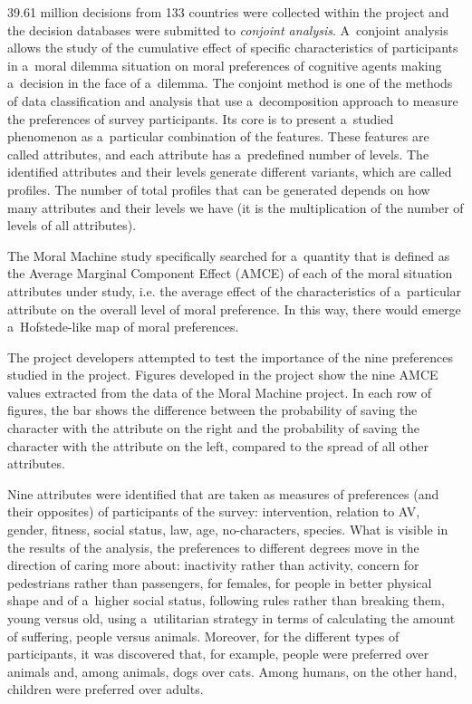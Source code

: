 39.61 million decisions from 133 countries were collected within the project and the decision databases were submitted to \textit{conjoint analysis}. A~conjoint analysis allows the study of the cumulative effect of specific characteristics of participants in a~moral dilemma situation on moral preferences of cognitive agents making a~decision in the face of a~dilemma. The conjoint method is one of the methods of data classification and analysis that use a~decomposition approach to measure the preferences of survey participants. Its core is to present a~studied phenomenon as a~particular combination of the features. These features are called attributes, and each attribute has a~predefined number of levels. The identified attributes and their levels generate different variants, which are called profiles. The number of total profiles that can be generated depends on how many attributes and their levels we have (it is the multiplication of the number of levels of all attributes).

The Moral Machine study specifically searched for a~quantity that is defined as the Average Marginal Component Effect (AMCE) of each of the moral situation attributes under study, i.e. the average effect of the characteristics of a~particular attribute on the overall level of moral preference. In this way, there would emerge a~Hofstede-like map of moral preferences.

The project developers attempted to test the importance of the nine preferences studied in the project. Figures developed in the project show the nine AMCE values extracted from the data of the Moral Machine project. In each row of figures, the bar shows the difference between the probability of saving the character with the attribute on the right and the probability of saving the character with the attribute on the left, compared to the spread of all other attributes.

Nine attributes were identified that are taken as measures of preferences (and their opposites) of participants of the survey: intervention, relation to AV, gender, fitness, social status, law, age, no-characters, species. What is visible in the results of the analysis, the preferences to different degrees move in the direction of caring more about: inactivity rather than activity, concern for pedestrians rather than passengers, for females, for people in better physical shape and of a~higher social status, following rules rather than breaking them, young versus old, using a~utilitarian strategy in terms of calculating the amount of suffering, people versus animals. Moreover, for the different types of participants, it was discovered that, for example, people were preferred over animals and, among animals, dogs over cats. Among humans, on the other hand, children were preferred over adults.

